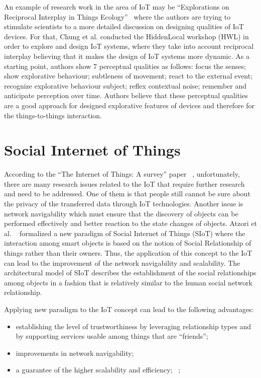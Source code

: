 \par An example of research work in the area of IoT may be “Explorations on Reciprocal Interplay in Things Ecology”~\cite{chung2018explorations} where the authors are trying to stimulate scientists to a more detailed discussion on designing qualities of IoT devices. For that, Chung et al. conducted the HiddenLocal workshop (HWL) in order to explore and design IoT systems, where they take into account reciprocal interplay believing that it makes the design of IoT systems more dynamic. As a starting point, authors show 7 perceptual qualities as follows: focus the senses; show explorative behaviour; subtleness of movement; react to the external event; recognize explorative behaviour subject; reflex contextual noise; remember and anticipate perception over time. Authors believe that these perceptual qualities are a good approach for designed explorative features of devices and therefore for the things-to-things interaction.  

\section{Social Internet of Things}
\label{sec:Social Internet of Things}
According to the “The Internet of Things: A survey” paper ~\cite{atzori2010internet}, unfortunately, there are many research issues related to the IoT that require further research and need to be addressed. One of them is that people still cannot be sure about the privacy of the transferred data through IoT technologies. Another issue is network navigability which must ensure that the discovery of objects can be performed effectively and better reaction to the state changes of objects. Atzori et al. ~\cite{atzori2011siot} formalized a new paradigm of Social Internet of Things (SIoT) where the interaction among smart objects is based on the notion of Social Relationship of things rather than their owners. Thus, the application of this concept to the IoT can lead to the improvement of the network navigability and scalability. The architectural model of SIoT describes the establishment of the social relationships among objects in a fashion that is relatively similar to the human social network relationship. 
\par Applying new paradigm to the IoT concept can lead to the following advantages: 
\begin{itemize}
  \item establishing the level of trustworthiness by leveraging relationship types and by supporting services usable among things that are “friends”; 
  \item improvements in network navigability; 
  \item a guarantee of the higher scalability and efficiency; ~\cite{atzori2012social};
\end{itemize}

